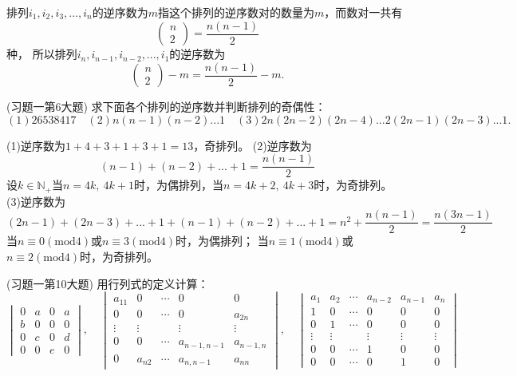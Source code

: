 \begin{solution}{}{}
    排列$i_1,i_2,i_3,...,i_n$的逆序数为$m$指这个排列的逆序数对的数量为$m$，而数对一共有
    \[\left(\begin{array}{c}n\\2\end{array}\right)=\frac{n(n-1)}{2}\]种，
    所以排列$i_n,i_{n-1},i_{n-2},...,i_1$的逆序数为\[\left(\begin{array}{c}n\\2\end{array}\right)-m=\frac{n(n-1)}{2}-m.\]
\end{solution}
\begin{example}{(习题一第6大题)}{}
    求下面各个排列的逆序数并判断排列的奇偶性：\vspace{-5pt}\[
    (1)26538417\quad(2)n(n-1)(n-2)...1\quad(3)2n(2n-2)(2n-4)...2(2n-1)(2n-3)...1.\]
\end{example}
\begin{solution}{}{}
    (1)逆序数为$1+4+3+1+3+1=13$，奇排列。
    (2)逆序数为\[(n-1)+(n-2)+...+1=\frac{n(n-1)}{2}\]
    设$k\in\mathbb{N}_+$当$n=4k,~4k+1$时，为偶排列，当$n=4k+2,~4k+3$时，为奇排列。
    (3)逆序数为\[(2n-1)+(2n-3)+...+1+(n-1)+(n-2)+...+1=n^2+\frac{n(n-1)}{2}=\frac{n(3n-1)}{2}\]
    当$n\equiv0(\mathrm{mod}4)$或$n\equiv3(\mathrm{mod}4)$时，为偶排列；
    当$n\equiv1(\mathrm{mod}4)$或$n\equiv2(\mathrm{mod}4)$时，为奇排列。
\end{solution}
\begin{example}{(习题一第10大题)}{}
    用行列式的定义计算：
    \[\begin{vmatrix}
        0&a&0&a\\
        b&0&0&0\\
        0&c&0&d\\
        0&0&e&0
    \end{vmatrix},\quad\begin{vmatrix}
        a_{11}&0&\cdots&0&0\\0&0&\cdots&0&a_{2n}\\
        \vdots&\vdots&&\vdots&\vdots\\
        0&0&\cdots&a_{n-1,n-1}&a_{n-1,n}\\
        0&a_{n2}&\cdots&a_{n,n-1}&a_{nn}\end{vmatrix},\quad\begin{vmatrix}
        a_1&a_2&\cdots&a_{n-2}&a_{n-1}&a_n\\
        1&0&\cdots&0&0&0\\0&1&\cdots&0&0&0\\
        \vdots&\vdots&&\vdots&\vdots&\vdots\\
        0&0&\cdots&1&0&0\\0&0&\cdots&0&1&0\end{vmatrix}\]
\end{example}
